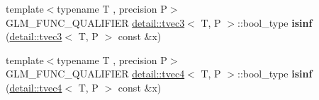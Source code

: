 \begin{DoxyCompactItemize}
\item 
{\footnotesize template$<$typename T , precision P$>$ }\\G\+L\+M\+\_\+\+F\+U\+N\+C\+\_\+\+Q\+U\+A\+L\+I\+F\+I\+ER \hyperlink{structglm_1_1detail_1_1tvec3}{detail\+::tvec3}$<$ T, P $>$\+::bool\+\_\+type {\bfseries isinf} (\hyperlink{structglm_1_1detail_1_1tvec3}{detail\+::tvec3}$<$ T, P $>$ const \&x)\hypertarget{namespaceglm_a8a5d58940820a56efe7f242f1730514e}{}\label{namespaceglm_a8a5d58940820a56efe7f242f1730514e}

\item 
{\footnotesize template$<$typename T , precision P$>$ }\\G\+L\+M\+\_\+\+F\+U\+N\+C\+\_\+\+Q\+U\+A\+L\+I\+F\+I\+ER \hyperlink{structglm_1_1detail_1_1tvec4}{detail\+::tvec4}$<$ T, P $>$\+::bool\+\_\+type {\bfseries isinf} (\hyperlink{structglm_1_1detail_1_1tvec4}{detail\+::tvec4}$<$ T, P $>$ const \&x)\hypertarget{namespaceglm_a6f75f001a105575c80f78d83e038b2d1}{}\label{namespaceglm_a6f75f001a105575c80f78d83e038b2d1}


\end{DoxyCompactItemize}
